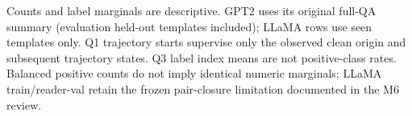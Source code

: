 \noindent Counts and label marginals are descriptive. GPT2 uses its original full-QA summary (evaluation held-out templates included); LLaMA rows use seen templates only. Q1 trajectory starts supervise only the observed clean origin and subsequent trajectory states. Q3 label index means are not positive-class rates. Balanced positive counts do not imply identical numeric marginals; LLaMA train/reader-val retain the frozen pair-closure limitation documented in the M6 review.
\endgroup
